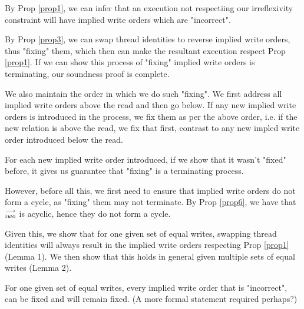         By Prop \ref{prop1}, we can infer that an execution not respectiing our irreflexivity constraint will have implied write orders which are "incorrect". 

        
        By Prop \ref{prop3}, we can swap thread identities to reverse implied write orders, thus "fixing" them, which then can make the resultant execution respect Prop \ref{prop1}. If we can show this process of "fixing" implied write orders is terminating, our soundness proof is complete. 

        We also maintain the order in which we do such "fixing". We first address all implied write orders above the read and then go below. 
        If any new implied write orders is introduced in the process, we fix them as per the above order, i.e. if the new relation is above the read, we fix that first, contrast to any new impled write order introduced below the read. 
        
        For each new implied write order introduced, if we show that it wasn't "fixed" before, it gives us guarantee that "fixing" is a terminating process. 
        
        However, before all this, we first need to ensure that implied write orders do not form a cycle, as "fixing" them may not terminate.  By Prop \ref{prop6}, we have that $\stackrel{\longrightarrow}{_{iwo}}$ is acyclic, hence they do not form a cycle.  
        
        Given this, we show that for one given set of equal writes, swapping thread identities will always result in the implied write orders respecting Prop \ref{prop1} (Lemma 1). 
        We then show that this holds in general given multiple sets of equal writes (Lemma 2).  



        \begin{lemma}
            \label{iwo-lemma1}
            For one given set of equal writes, every implied write order that is "incorrect", can be fixed and will remain fixed.  
            (A more formal statement required perhaps?)
        \end{lemma}
            
